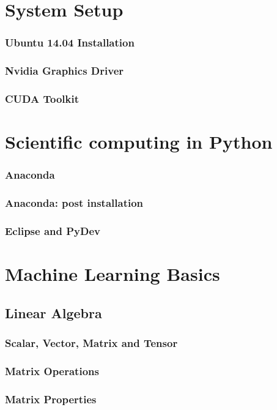\documentclass{beamer}
\begin{document}
\section{System Setup}

\begin{frame}
    \frametitle{Ubuntu 14.04 Installation}
    
\end{frame}

\begin{frame}
    \frametitle{Nvidia Graphics Driver}
\end{frame}

\begin{frame}
    \frametitle{CUDA Toolkit}
    
\end{frame}

\section{Scientific computing in Python}

\begin{frame}
    \frametitle{Anaconda}
\end{frame}

\begin{frame}
    \frametitle{Anaconda: post installation}
\end{frame}

\begin{frame}
    \frametitle{Eclipse and PyDev}
\end{frame}

\section{Machine Learning Basics}

\subsection{Linear Algebra}

\begin{frame}
    \frametitle{Scalar, Vector, Matrix and Tensor}
\end{frame}

\begin{frame}
    \frametitle{Matrix Operations}
\end{frame}

\begin{frame}
    \frametitle{Matrix Properties}
\end{frame}
\end{document}

